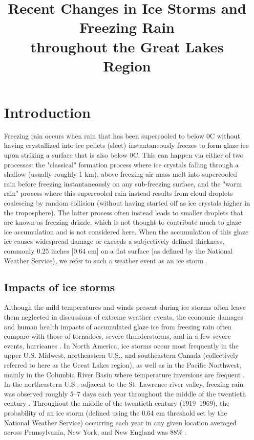 \documentclass[twocol]{ametsoc}
\title{Recent Changes in Ice Storms and Freezing Rain\\ throughout the Great Lakes Region}
\affiliation{ National Renewable Energy Laboratory, Golden, Colorado}
\begin{document}
\maketitle
%
\section{Introduction}
Freezing rain occurs when rain that has been supercooled to below 0\degree C without having crystallized into ice pellets (sleet) instantaneously freezes to form glaze ice upon striking a surface that is also below 0\degree C. This can happen via either of two processes: the "classical" formation process where ice crystals falling through a shallow (usually roughly 1 km), above-freezing air mass melt into supercooled rain before freezing instantaneously on any sub-freezing surface, and the "warm rain" process where this supercooled rain instead results from cloud droplets coalescing by random collision (without having started off as ice crystals higher in the troposphere). The latter process often instead leads to smaller droplets that are known as freezing drizzle, which is not thought to contribute much to glaze ice accumulation and is not considered here. When the accumulation of this glaze ice causes widespread damage or exceeds a subjectively-defined thickness, commonly 0.25 inches [0.64 cm] on a flat surface (as defined by the National Weather Service), we refer to such a weather event as an ice storm \citep{nwsglossary}.

\subsection{Impacts of ice storms}
Although the mild temperatures and winds present during ice storms often leave them neglected in discussions of extreme weather events, the economic damages and human health impacts of accumulated glaze ice from freezing rain often compare with those of tornadoes, severe thunderstorms, and in a few severe events, hurricanes \citep{lott2006tracking}. In North America, ice storms occur most frequently in the upper U.S. Midwest, northeastern U.S., and southeastern Canada (collectively referred to here as the Great Lakes region), as well as in the Pacific Northwest, mainly in the Columbia River Basin where temperature inversions are frequent \citep{changnon2003temporal, bernstein2000regional}. In the northeastern U.S., adjacent to the St. Lawrence river valley, freezing rain was observed roughly 5--7 days each year throughout the middle of the twentieth century \citep{changnon2003temporal}. Throughout the middle of the twentieth century (1919--1969), the probability of an ice storm (defined using the 0.64 cm threshold set by the National Weather Service) occurring each year in any given location averaged across Pennsylvania, New York, and New England was 88\% \citep{tattelman1973estimated}. 
\end{document}
